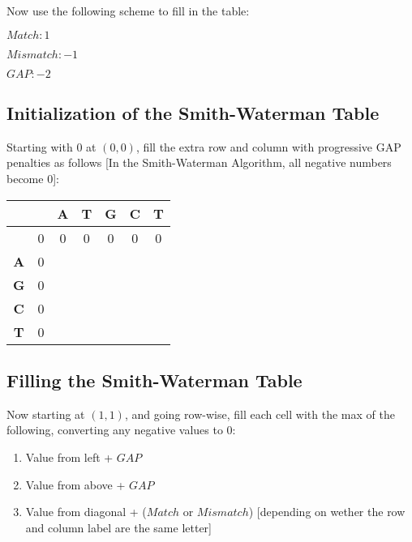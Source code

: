 Now use the following scheme to fill in the table:

$Match: 1$

$Mismatch: -1$

$GAP: -2$

\subsection{Initialization of the Smith-Waterman Table}

Starting with 0 at $(0,0)$, fill the extra row and column with progressive GAP penalties as follows [In the Smith-Waterman Algorithm, all negative numbers become 0]:

\begin{table}[htbp]
    \centering
    \begin{tabular}{|c|c|c|c|c|c|c|}
        \hline
          &  & \textbf{A} & \textbf{T} & \textbf{G} & \textbf{C} & \textbf{T} \\
        \hline
        & 0 & 0 & 0 & 0 & 0 & 0 \\
        \hline
        \textbf{A} & 0 &  &  &  &  &  \\
        \hline
        \textbf{G} & 0 &  &  &  &  &  \\
        \hline
        \textbf{C} & 0 &  &  &  &  &  \\
        \hline
        \textbf{T} & 0 &  &  &  &  &  \\
        \hline
    \end{tabular}
\end{table}

\subsection{Filling the Smith-Waterman Table}

Now starting at $(1,1)$, and going row-wise, fill each cell with the max of the following, converting any negative values to 0:

\begin{enumerate}
    \item Value from left + $GAP$
    
    \item Value from above + $GAP$
    
    \item Value from diagonal + ($Match$ or $Mismatch$) [depending on wether the row and column label are the same letter]

\end{enumerate}

